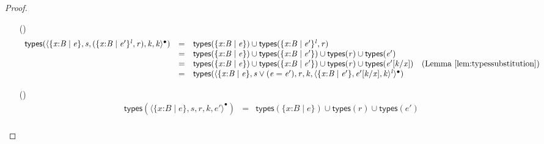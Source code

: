 \documentclass[9pt]{extarticle}
\newcommand{\ottnt}[1]{\mathit{#1}}
\newcommand{\ottsym}[1]{#1}
\begin{document}
\begin{lemma}
\begin{proof}
{\begin{itemize}
\[\begin{array}{rclr}
         \mathsf{types} (  \langle   \{ \mathit{x} \mathord{:} \ottnt{B} \mathrel{\mid} \ottnt{e} \}  ,   \mathord{\checkmark}  ,  \mathsf{nil} ,  \ottnt{k} ,  \ottnt{k}  \rangle^{\bullet}  )  &=&  \mathsf{types} (  \{ \mathit{x} \mathord{:} \ottnt{B} \mathrel{\mid} \ottnt{e} \}  )  & \\
        &\supseteq&  \emptyset  & \\
        &=&  \mathsf{types} ( \ottnt{k} )  &
      \end{array} \]
    \item[(\E{StackPop})] \[ \begin{array}{rclr}
         \mathsf{types} (  \langle   \{ \mathit{x} \mathord{:} \ottnt{B} \mathrel{\mid} \ottnt{e} \}  ,  \ottnt{s} ,  \ottsym{(}    \{ \mathit{x} \mathord{:} \ottnt{B} \mathrel{\mid} \ottnt{e'} \}^{ \ottnt{l} }  , \ottnt{r}   \ottsym{)} ,  \ottnt{k} ,  \ottnt{k}  \rangle^{\bullet}  )  &=&   \mathsf{types} (  \{ \mathit{x} \mathord{:} \ottnt{B} \mathrel{\mid} \ottnt{e} \}  )   \cup   \mathsf{types} (   \{ \mathit{x} \mathord{:} \ottnt{B} \mathrel{\mid} \ottnt{e'} \}^{ \ottnt{l} }  , \ottnt{r}  )   & \\
        &=&     \mathsf{types} (  \{ \mathit{x} \mathord{:} \ottnt{B} \mathrel{\mid} \ottnt{e} \}  )   \cup   \mathsf{types} (  \{ \mathit{x} \mathord{:} \ottnt{B} \mathrel{\mid} \ottnt{e'} \}  )    \cup   \mathsf{types} ( \ottnt{r} )    \cup   \mathsf{types} ( \ottnt{e'} )   & \\
        &=&     \mathsf{types} (  \{ \mathit{x} \mathord{:} \ottnt{B} \mathrel{\mid} \ottnt{e} \}  )   \cup   \mathsf{types} (  \{ \mathit{x} \mathord{:} \ottnt{B} \mathrel{\mid} \ottnt{e'} \}  )    \cup   \mathsf{types} ( \ottnt{r} )    \cup   \mathsf{types} (  \ottnt{e'}  [  \ottnt{k} / \mathit{x}  ]  )   & \text{(Lemma~\ref{lem:typessubstitution})} \\
        &=&  \mathsf{types} (  \langle   \{ \mathit{x} \mathord{:} \ottnt{B} \mathrel{\mid} \ottnt{e} \}  ,   \ottnt{s}  \vee ( \ottnt{e}  =  \ottnt{e'} )  ,  \ottnt{r} ,  \ottnt{k} ,   \langle   \{ \mathit{x} \mathord{:} \ottnt{B} \mathrel{\mid} \ottnt{e'} \}  ,   \ottnt{e'}  [  \ottnt{k} / \mathit{x}  ]  ,  \ottnt{k}  \rangle^{ \ottnt{l} }   \rangle^{\bullet}  )  &
      \end{array} \]
    \item[(\E{StackInner})] \[ \begin{array}{rclr}
         \mathsf{types} (  \langle   \{ \mathit{x} \mathord{:} \ottnt{B} \mathrel{\mid} \ottnt{e} \}  ,  \ottnt{s} ,  \ottnt{r} ,  \ottnt{k} ,  \ottnt{e'}  \rangle^{\bullet}  )  &=&    \mathsf{types} (  \{ \mathit{x} \mathord{:} \ottnt{B} \mathrel{\mid} \ottnt{e} \}  )   \cup   \mathsf{types} ( \ottnt{r} )    \cup   \mathsf{types} ( \ottnt{e'} )   & \\

\end{array}\]
\end{itemize}}
\end{proof}
\end{lemma}
\end{document}

